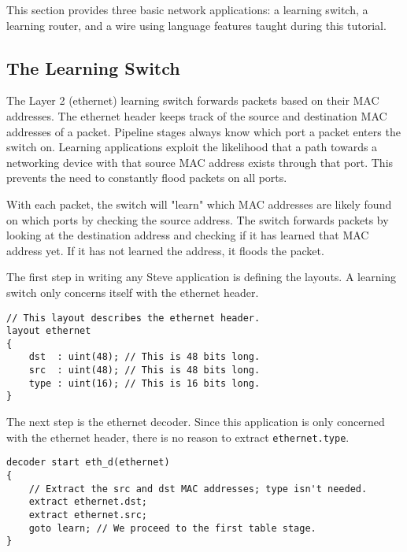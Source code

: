 This section provides three basic network applications: a learning switch, a learning router, and a
wire using language features taught during this tutorial.

\subsection{The Learning Switch} \label{tut:learning_switch}

The Layer 2 (ethernet) learning switch forwards packets based on their MAC addresses.
The ethernet header keeps track of the source and
destination MAC addresses of a packet. Pipeline stages always know which port a
packet enters the switch on. Learning applications exploit the likelihood that a
path towards a networking device with that source MAC address exists through
that port. This prevents the need to constantly flood packets on all ports.

With each packet, the switch will "learn" which MAC addresses are likely found
on which ports by checking the source address. The switch forwards packets by
looking at the destination address and checking if it has learned that MAC
address yet. If it has not learned the address, it floods the packet.

The first step in writing any Steve application is defining the layouts. A
learning switch only concerns itself with the ethernet header.

\begin{codepage}
\begin{lstlisting}
// This layout describes the ethernet header.
layout ethernet
{
	dst  : uint(48); // This is 48 bits long.
	src  : uint(48); // This is 48 bits long.
	type : uint(16); // This is 16 bits long.
}
\end{lstlisting}
\end{codepage}

The next step is the ethernet decoder. Since this application is only concerned with the
ethernet header, there is no reason to extract
\texttt{ethernet.type}.

\begin{codepage}
\begin{lstlisting}
decoder start eth_d(ethernet)
{
	// Extract the src and dst MAC addresses; type isn't needed.
	extract ethernet.dst;
	extract ethernet.src;
	goto learn; // We proceed to the first table stage.
}
\end{lstlisting}
\end{codepage}

